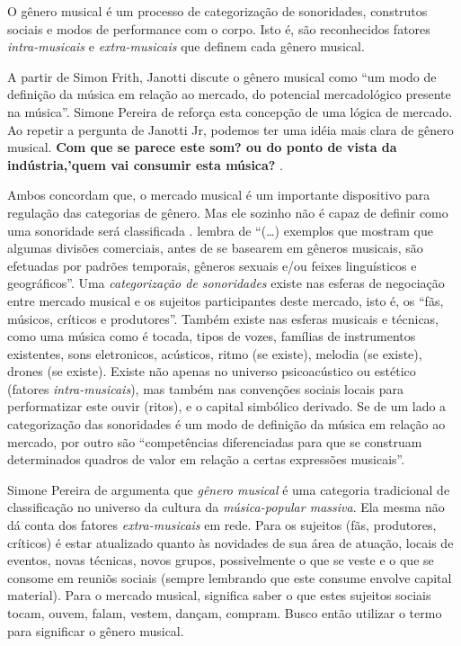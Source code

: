 O gênero musical é um processo de categorização de sonoridades, construtos sociais e modos de performance com o corpo. Isto é, são reconhecidos fatores \emph{intra-musicais} e \emph{extra-musicais} que definem cada gênero musical.

A partir de Simon Frith, Janotti  discute o gênero musical como ``um modo de definição da música em relação ao mercado, do potencial mercadológico presente na música''. Simone Pereira de  reforça esta concepção de uma lógica de mercado. Ao repetir a pergunta de Janotti Jr, podemos ter uma idéia mais clara de gênero musical. \textbf{Com que se parece este som? ou do ponto de vista da indústria,'quem vai consumir esta música?} .

Ambos concordam que, o mercado musical é um importante dispositivo para regulação das categorias de gênero. Mas ele sozinho não é capaz de definir como uma sonoridade será classificada .  lembra de  ``(\ldots) exemplos que mostram que algumas divisões comerciais, antes de se basearem em gêneros musicais, são efetuadas por padrões temporais, gêneros sexuais e/ou feixes linguísticos e geográficos''. Uma \emph{categorização de sonoridades} existe nas esferas de negociação entre mercado musical e os sujeitos participantes deste mercado, isto é, os ``fãs, músicos, críticos e produtores''. Também existe nas esferas musicais e técnicas, como uma música como é tocada, tipos de vozes, famílias de instrumentos existentes, sons eletronicos, acústicos, ritmo (se existe), melodia (se existe), drones (se existe). Existe não apenas no universo psicoacústico ou estético (fatores \emph{intra-musicais}), mas também nas convenções sociais locais para performatizar este ouvir (ritos), e o capital simbólico derivado. Se de um lado a categorização das sonoridades é um modo de definição da música em relação ao mercado, por outro são ``competências diferenciadas para que se construam determinados quadros de valor em relação a certas expressões musicais''. 

Simone Pereira de  argumenta que \emph{gênero musical} é uma categoria tradicional de classificação no universo da cultura da \emph{música-popular massiva}. Ela mesma não dá conta dos fatores \emph{extra-musicais} em rede. Para os sujeitos (fãs, produtores, críticos) é estar atualizado quanto às novidades de sua área de atuação, locais de eventos, novas técnicas, novos grupos, possivelmente o que se veste e o que se consome em reuniõs sociais (sempre lembrando que este consume envolve capital material). Para o mercado musical, significa saber o que estes sujeitos sociais tocam, ouvem, falam, vestem, dançam, compram. Busco então utilizar o termo  para significar o gênero musical. 

